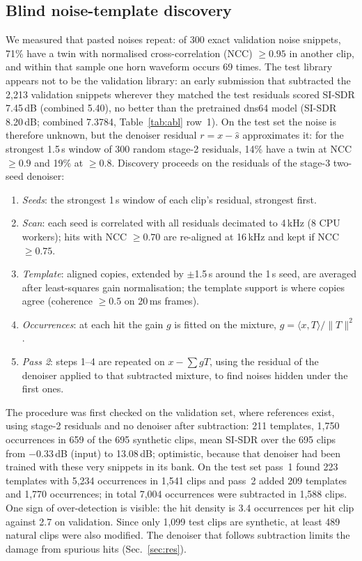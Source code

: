\documentclass[conference]{IEEEtran}
\begin{document}
\subsection{Blind noise-template discovery}\label{sec:tpl}
We measured that pasted noises repeat: of 300 exact validation noise snippets, 71\% have a twin with normalised
cross-correlation (NCC) $\geq0.95$ in another clip, and within that sample one horn waveform occurs 69 times. The test
library appears not to be the validation library: an early submission that subtracted the 2,213 validation snippets wherever
they matched the test residuals scored SI\nobreakdash-SDR 7.45\,dB (combined 5.40), no better than the pretrained
dns64 model (SI\nobreakdash-SDR 8.20\,dB; combined 7.3784, Table~\ref{tab:abl} row~1). On the test set the noise is therefore unknown, but the denoiser residual
$r = x - \hat{s}$ approximates it: for the strongest 1.5\,s window of 300 random stage-2 residuals, 14\% have a twin at
NCC $\geq0.9$ and 19\% at $\geq0.8$. Discovery proceeds on the residuals of the stage-3 two-seed denoiser:
\begin{enumerate}
\item \emph{Seeds}: the strongest 1\,s window of each clip's residual, strongest first.
\item \emph{Scan}: each seed is correlated with all residuals decimated to 4\,kHz (8 CPU workers); hits with NCC
$\geq0.70$ are re-aligned at 16\,kHz and kept if NCC $\geq0.75$.
\item \emph{Template}: aligned copies, extended by $\pm$1.5\,s around the 1\,s seed, are averaged after
least-squares gain normalisation; the template support is where copies agree (coherence $\geq0.5$ on 20\,ms frames).
\item \emph{Occurrences}: at each hit the gain $g$ is fitted on the mixture, $g=\langle x, T\rangle/\lVert T\rVert^2$.
\item \emph{Pass 2}: steps 1--4 are repeated on $x-\sum gT$, using the residual of the denoiser applied to that
subtracted mixture, to find noises hidden under the first ones.
\end{enumerate}
The procedure was first checked on the validation set, where references exist, using stage-2 residuals and no
denoiser after subtraction: 211 templates, 1,750 occurrences in 659 of the 695 synthetic clips, mean
SI\nobreakdash-SDR over the 695 clips from $-0.33$\,dB (input) to 13.08\,dB; optimistic, because that denoiser had
been trained with these very snippets in its bank. On the test set pass~1 found 223 templates with 5,234
occurrences in 1,541 clips and pass~2 added 209 templates and 1,770 occurrences; in total 7,004 occurrences were
subtracted in 1,588 clips. One sign of over-detection is visible: the hit density is 3.4 occurrences per hit clip
against 2.7 on validation. Since only 1,099 test clips are synthetic, at least 489 natural clips were also modified.
The denoiser that follows subtraction limits the damage from spurious hits (Sec.~\ref{sec:res}).
\end{document}
